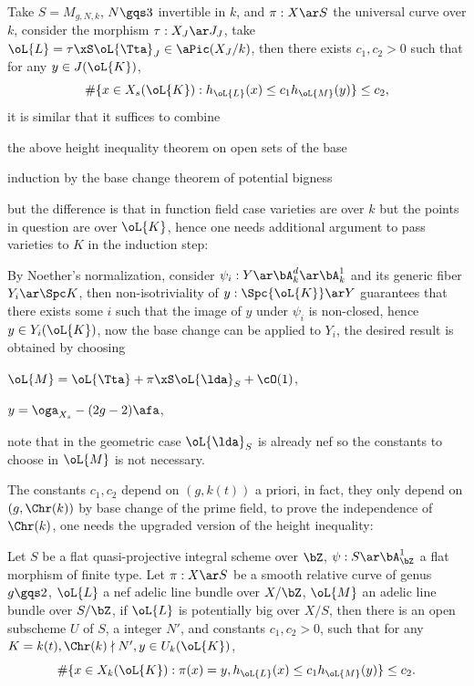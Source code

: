 \documentclass[a4paper, twoside]{article}
\begin{document}
Take $S=M_{g,N,k}$, $N\gqs3$ invertible in $k$, and $\pi:X\ar S$ the universal curve over $k$, consider the morphism $\tau:X_{J}\ar J_{J}$, take $\oL{L}=\tau\xS\oL{\Tta}_{J}\in\aPic(X_{J}/k)$, then there exists $c_{1},c_{2}>0$ such that for any $y\in J(\oL{K})$,
\[
	\#\{x\in X_{s}(\oL{K}):h_{\oL{L}}(x)\leq c_{1}h_{\oL{M}}(y)\}\leq c_{2},
\]
it is similar that it suffices to combine
\begin{enr}
	\item the above height inequality theorem on open sets of the base
	\item induction by the base change theorem of potential bigness
\end{enr}
but the difference is that in function field case varieties are over $k$ but the points in question are over $\oL{K}$, hence one needs additional argument to pass varieties to $K$ in the induction step:

By Noether's normalization, consider $\psi_{i}:Y\ar\bA_{k}^{d}\ar\bA_{k}^{1}$ and its generic fiber $Y_{i}\ar\Spc K$, then non-isotriviality of $y:\Spc{\oL{K}}\ar Y$ guarantees that there exists some $i$ such that the image of $y$ under $\psi_{i}$ is non-closed, hence $y\in Y_{i}(\oL{K})$, now the base change can be applied to $Y_{i}$, the desired result is obtained by choosing
\begin{enr}
	\item $\oL{M}=\oL{\Tta}+\pi\xS\oL{\lda}_{S}+\cO(1)$,
	\item $y=\oga_{X_{s}}-(2g-2)\afa$,
\end{enr}
note that in the geometric case $\oL{\lda}_{S}$ is already nef so the constants to choose in $\oL{M}$ is not necessary.



The constants $c_{1},c_{2}$ depend on $(g,k(t))$ a priori, in fact, they only depend on $(g,\Chr(k))$ by base change of the prime field, to prove the independence of $\Chr(k)$, one needs the upgraded version of the height inequality:

\begin{thm}
	Let $S$ be a flat quasi-projective integral scheme over $\bZ$, $\psi:S\ar\bA_{\bZ}^{1}$ a flat morphism of finite type. Let $\pi:X\ar S$ be a smooth relative curve of genus $g\gqs2$, $\oL{L}$ a nef adelic line bundle over $X/\bZ$, $\oL{M}$ an adelic line bundle over $S/\bZ$, if $\oL{L}$ is potentially big over $X/S$, then there is an open subscheme $U$ of $S$, a integer $N'$, and constants $c_{1},c_{2}>0$, such that for any $K=k(t), \Chr(k)\nmid N', y\in U_{k}(\oL{K})$,
	\[
		\#\{x\in X_{k}(\oL{K}):\pi(x)=y, h_{\oL{L}}(x)\leq c_{1}h_{\oL{M}}(y)\}\leq c_{2}.
	\]
\end{thm}
\end{document}
